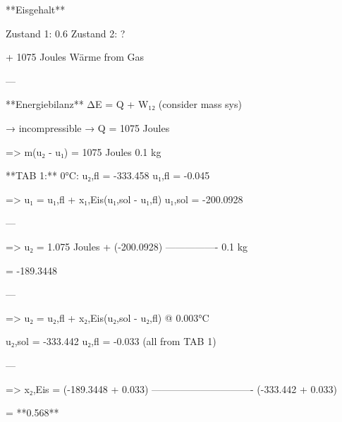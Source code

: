 **Eisgehalt**  

Zustand 1: 0.6  
Zustand 2: ?  

+ 1075 Joules Wärme from Gas  

---

**Energiebilanz**  
ΔE = Q + W₁₂  
(consider mass sys)  

→ incompressible  
→ Q = 1075 Joules  

=> m(u₂ - u₁) = 1075 Joules  
0.1 kg  

**TAB 1:**  
0°C:  
u₂,fl = -333.458  
u₁,fl = -0.045  

=> u₁ = u₁,fl + x₁,Eis(u₁,sol - u₁,fl)  
u₁,sol = -200.0928  

---

=> u₂ = 1.075 Joules  
+ (-200.0928)  
----------------  
0.1 kg  

= -189.3448  

---

=> u₂ = u₂,fl + x₂,Eis(u₂,sol - u₂,fl)  
@ 0.003°C  

u₂,sol = -333.442  
u₂,fl = -0.033  
(all from TAB 1)  

---

=> x₂,Eis = (-189.3448 + 0.033)  
-------------------------------  
(-333.442 + 0.033)  

= **0.568**